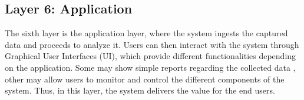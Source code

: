 
\subsection{Layer 6: Application}
\label{sec:iot-model-layer6}



The sixth layer is the application layer, where the system ingests the captured data and proceeds to analyze it. Users can then interact with the system through Graphical User Interfaces (UI), which provide different functionalities depending on the application. Some may show simple reports regarding the collected data \cite{Doukas2012, Wu2020}, other may allow users to monitor and control the different components of the system. Thus, in this layer, the system delivers the value for the end users.






